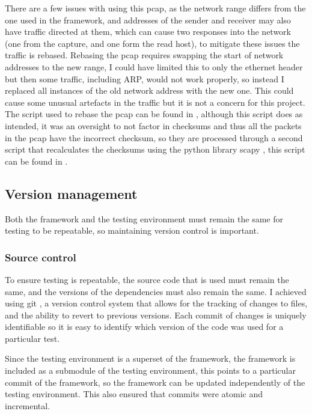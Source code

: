 There are a few issues with using this pcap, as the network range differs from the one used in the framework, and addresses of the sender and receiver may also have traffic directed at them, which can cause two responses into the network (one from the capture, and one form the read host), to mitigate these issues the traffic is rebased. Rebasing the pcap requires swapping the start of network addresses to the new range, I could have limited this to only the ethernet header but then some traffic, including ARP, would not work properly, so instead I replaced all instances of the old network address with the new one. This could cause some unusual artefacts in the traffic but it is not a concern for this project. The script used to rebase the pcap can be found in , although this script does as intended, it was an oversight to not factor in checksums and thus all the packets in the pcap have the incorrect checksum, so they are processed through a second script that recalculates the checksums using the python library scapy \cite{scapy}, this script can be found in .

\subsection{Version management}

Both the framework and the testing environment must remain the same for testing to be repeatable, so maintaining version control is important.

\subsubsection{Source control}

To ensure testing is repeatable, the source code that is used must remain the same, and the versions of the dependencies must also remain the same. I achieved using git \cite{git}, a version control system that allows for the tracking of changes to files, and the ability to revert to previous versions. Each commit of changes is uniquely identifiable so it is easy to identify which version of the code was used for a particular test.

Since the testing environment is a superset of the framework, the framework is included as a submodule of the testing environment, this points to a particular commit of the framework, so the framework can be updated independently of the testing environment. This also ensured that commits were atomic and incremental.

